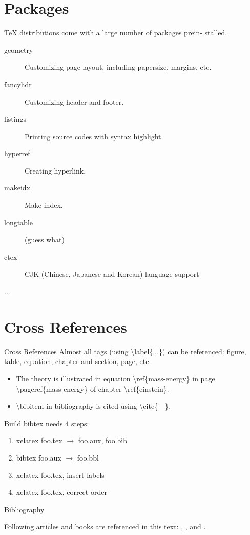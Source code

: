 \documentclass[10pt]{beamer}
\begin{document}
\section{Packages}
\begin{frame}
    \TeX{} distributions come with a large number of packages prein-
    stalled.
\begin{description}
    \item [geometry] Customizing page layout, including papersize,
        margins, etc.
    \item [fancyhdr] Customizing header and footer.
    \item [listings] Printing source codes with syntax highlight.
    \item [hyperref] Creating hyperlink.
    \item [makeidx] Make index.
    \item [longtable] (guess what)
    \item [ctex] CJK (Chinese, Japanese and Korean) language support
    \item [...]
\end{description}
\end{frame}

\section{Cross References}
\begin{frame}{Cross References}
    Almost all tags (using \textbackslash label\{...\})
    can be referenced: figure, table, equation,
    chapter and section, page, etc.
\begin{itemize}
    \item The theory is illustrated in equation
        \alert{\textbackslash ref\{mass-energy\}} in page 
        \alert{\textbackslash pageref\{mass-energy\}} of chapter
        \alert{\textbackslash ref\{einstein\}}.

    \item \textbackslash bibitem in bibliography is cited using
        \textbackslash cite\{\ \ \}.
\end{itemize}
Build bibtex needs 4 steps:
\begin{enumerate}
    \item xelatex foo.tex $\to$ foo.aux, foo.bib
    \item bibtex foo.aux  $\to$ foo.bbl
    \item xelatex foo.tex, insert labels
    \item xelatex foo.tex, correct order
\end{enumerate}
\end{frame}

\begin{frame}{Bibliography}

 Following articles and books are referenced in this text:
    \cite{Knuth_texbook}, \cite{texmanual}, \cite{David_tex_land} and
    \cite{website:top500}.


    
    
\end{frame}
\end{document}
